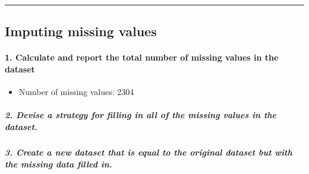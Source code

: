 \documentclass[
]{article}
\newenvironment{Shaded}{\begin{snugshade}}{\end{snugshade}}
\newcommand{\AttributeTok}[1]{\textcolor[rgb]{0.77,0.63,0.00}{#1}}
\newcommand{\FunctionTok}[1]{\textcolor[rgb]{0.00,0.00,0.00}{#1}}
\newcommand{\NormalTok}[1]{#1}
\newcommand{\OtherTok}[1]{\textcolor[rgb]{0.56,0.35,0.01}{#1}}
\newcommand{\SpecialCharTok}[1]{\textcolor[rgb]{0.00,0.00,0.00}{#1}}
\providecommand{\tightlist}{%
  \setlength{\itemsep}{0pt}\setlength{\parskip}{0pt}}
\begin{document}
\begin{center}\rule{0.5\linewidth}{0.5pt}\end{center}

\hypertarget{imputing-missing-values}{%
\subsection{Imputing missing values}\label{imputing-missing-values}}

\hypertarget{calculate-and-report-the-total-number-of-missing-values-in-the-dataset}{%
\paragraph{1. Calculate and report the total number of missing values in
the
dataset}\label{calculate-and-report-the-total-number-of-missing-values-in-the-dataset}}

\begin{Shaded}
\end{Shaded}

\begin{itemize}
\tightlist
\item
  Number of missing values: 2304
\end{itemize}

\hypertarget{devise-a-strategy-for-filling-in-all-of-the-missing-values-in-the-dataset.}{%
\subparagraph{2. Devise a strategy for filling in all of the missing
values in the
dataset.}\label{devise-a-strategy-for-filling-in-all-of-the-missing-values-in-the-dataset.}}

\hypertarget{create-a-new-dataset-that-is-equal-to-the-original-dataset-but-with-the-missing-data-filled-in.}{%
\subparagraph{3. Create a new dataset that is equal to the original
dataset but with the missing data filled
in.}\label{create-a-new-dataset-that-is-equal-to-the-original-dataset-but-with-the-missing-data-filled-in.}}

\begin{Shaded}
\end{Shaded}
\end{document}
